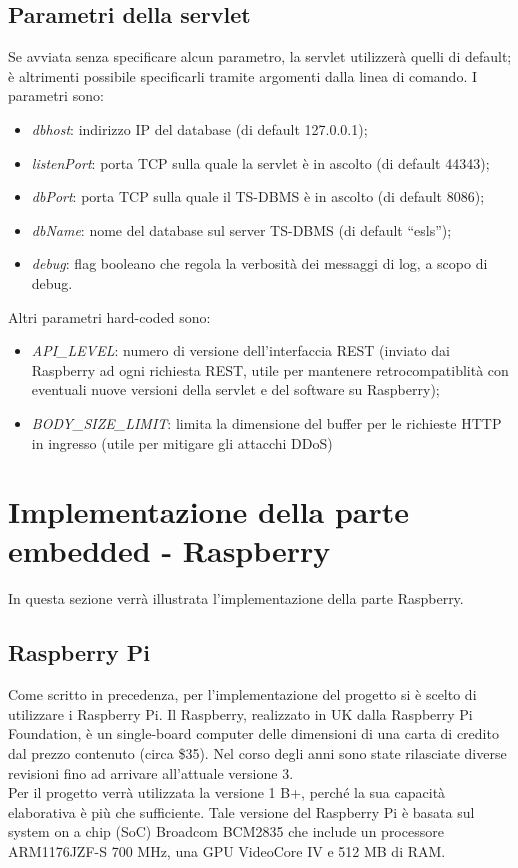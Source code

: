 \subsection{Parametri della servlet}
Se avviata senza specificare alcun parametro, la servlet utilizzerà quelli di default; è altrimenti possibile specificarli tramite argomenti dalla linea di comando. I parametri sono:
\begin{itemize}
 \item \textit{dbhost}: indirizzo IP del database (di default 127.0.0.1);
 \item \textit{listenPort}: porta TCP sulla quale la servlet è in ascolto (di default 44343);
 \item \textit{dbPort}: porta TCP sulla quale il TS-DBMS è in ascolto (di default 8086);
 \item \textit{dbName}: nome del database sul server TS-DBMS (di default ``esls'');
 \item \textit{debug}: flag booleano che regola la verbosità dei messaggi di log, a scopo di debug.
\end{itemize}
Altri parametri hard-coded sono:
\begin{itemize}
 \item \textit{API\_LEVEL}: numero di versione dell'interfaccia REST (inviato dai Raspberry ad ogni richiesta REST, utile per mantenere retrocompatiblità con eventuali nuove versioni della servlet e del software su Raspberry);
 \item \textit{BODY\_SIZE\_LIMIT}: limita la dimensione del buffer per le richieste HTTP in ingresso (utile per mitigare gli attacchi DDoS)
\end{itemize}


\section{Implementazione della parte embedded - Raspberry}
In questa sezione verrà illustrata l'implementazione della parte Raspberry.

\subsection{Raspberry Pi}
Come scritto in precedenza, per l'implementazione del progetto si è scelto di utilizzare i Raspberry Pi.
Il Raspberry, realizzato in UK dalla Raspberry Pi Foundation, è un single-board computer delle dimensioni di una carta di credito dal prezzo contenuto (circa \$35).
Nel corso degli anni sono state rilasciate diverse revisioni fino ad arrivare all’attuale versione 3.\\
Per il progetto verrà utilizzata la versione 1 B+, perché la sua capacità elaborativa è più che sufficiente.
Tale versione del Raspberry Pi è basata sul system on a chip (SoC) Broadcom BCM2835 che include un processore ARM1176JZF-S 700 MHz, una GPU VideoCore IV e 512 MB di RAM.

